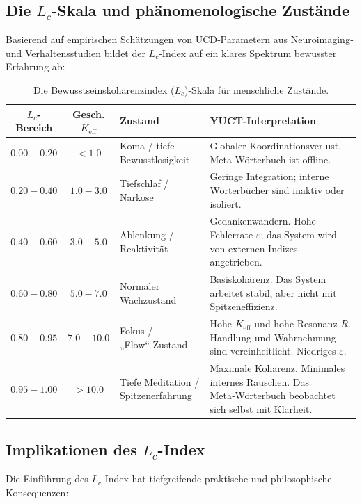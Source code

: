 \documentclass[12pt,a4paper]{article}
\begin{document}
	\subsection{Die \(L_c\)-Skala und phänomenologische Zustände}
	
	Basierend auf empirischen Schätzungen von UCD‑Parametern aus Neuroimaging‑ und Verhaltensstudien bildet der \(L_c\)-Index auf ein klares Spektrum bewusster Erfahrung ab:
	
	\begin{table}[H]
		\centering
		\caption{Die Bewusstseinskohärenzindex (\(L_c\))-Skala für menschliche Zustände.}
		\label{tab:Lc-scale}
		\begin{tabular}{c c l p{6cm}}
			\toprule
			\textbf{\(L_c\)-Bereich} & \textbf{Gesch. \(K_{\mathrm{eff}}\)} & \textbf{Zustand} & \textbf{YUCT‑Interpretation} \\
			\midrule
			\(0.00 - 0.20\) & \(< 1.0\) & Koma / tiefe Bewusstlosigkeit & Globaler Koordinationsverlust. Meta‑Wörterbuch ist offline. \\
			\(0.20 - 0.40\) & \(1.0 - 3.0\) & Tiefschlaf / Narkose & Geringe Integration; interne Wörterbücher sind inaktiv oder isoliert. \\
			\(0.40 - 0.60\) & \(3.0 - 5.0\) & Ablenkung / Reaktivität & Gedankenwandern. Hohe Fehlerrate \(\varepsilon\); das System wird von externen Indizes angetrieben. \\
			\(0.60 - 0.80\) & \(5.0 - 7.0\) & Normaler Wachzustand & Basiskohärenz. Das System arbeitet stabil, aber nicht mit Spitzeneffizienz. \\
			\(0.80 - 0.95\) & \(7.0 - 10.0\) & Fokus / „Flow“‑Zustand & Hohe \(K_{\mathrm{eff}}\) und hohe Resonanz \(R\). Handlung und Wahrnehmung sind vereinheitlicht. Niedriges \(\varepsilon\). \\
			\(0.95 - 1.00\) & \(> 10.0\) & Tiefe Meditation / Spitzenerfahrung & Maximale Kohärenz. Minimales internes Rauschen. Das Meta‑Wörterbuch beobachtet sich selbst mit Klarheit. \\
			\bottomrule
		\end{tabular}
	\end{table}
	
	\subsection{Implikationen des \(L_c\)-Index}
	
	Die Einführung des \(L_c\)-Index hat tiefgreifende praktische und philosophische Konsequenzen:
	
\end{document}
